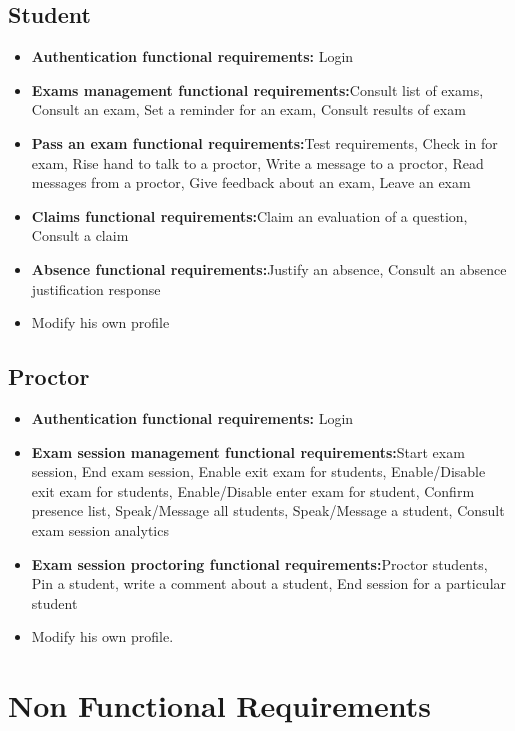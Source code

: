 \documentclass[]{uc2pfecaneva}
\begin{document}
    \subsection{Student}
    \begin{itemize}
        \item{\textbf{Authentication functional requirements:} Login}
        \item{\textbf{Exams management functional requirements:}Consult list of exams, Consult an exam, Set a reminder for an exam, Consult results of exam}
        \item{\textbf{Pass an exam functional requirements:}Test requirements, Check in for exam, Rise hand to talk to a proctor, Write a message to a proctor, Read messages from a proctor, Give feedback about an exam, Leave an exam}
        \item{\textbf{Claims functional requirements:}Claim an evaluation of a question, Consult a claim}
        \item{\textbf{Absence functional requirements:}Justify an absence, Consult an absence justification response}
        \item Modify his own profile
    \end{itemize}


    \subsection{Proctor}
    \begin{itemize}
        \item{\textbf{Authentication functional requirements:} Login}
        \item{\textbf{Exam session management functional requirements:}Start exam session, End exam session, Enable exit exam for students, Enable/Disable exit exam for students, Enable/Disable enter exam for student, Confirm presence list, Speak/Message all students, Speak/Message a student, Consult exam session analytics}
        \item{\textbf{Exam session proctoring functional requirements:}Proctor students, Pin a student, write a comment about a student, End session for a particular student}
        \item Modify his own profile.
    \end{itemize}


    \raggedright\section{Non Functional Requirements}
\end{document}
